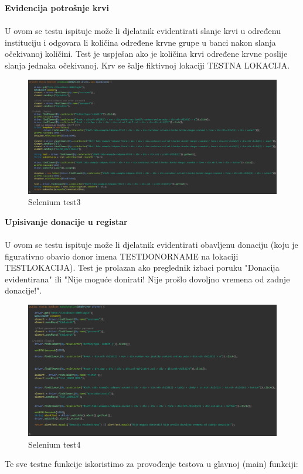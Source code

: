 \textbf{Evidencija potrošnje krvi}	
\\\\
U ovom se testu ispituje može li djelatnik evidentirati slanje krvi u određenu instituciju i odgovara li količina određene krvne grupe u banci nakon slanja očekivanoj količini. Test je uspješan ako je količina krvi određene krvne poslije slanja jednaka očekivanoj. Krv se šalje fiktivnoj lokaciji TESTNA LOKACIJA.
\begin{figure}[H]
	\centering
	\includegraphics[width=\textwidth, scale=0.5]{slike/selenium3}
	\caption{Selenium test3}
\end{figure}
\eject
\textbf{Upisivanje donacije u registar}	
\\\\
U ovom se testu ispituje može li djelatnik evidentirati obavljenu donaciju (koju je figurativno obavio donor imena TESTDONORNAME na lokaciji TESTLOKACIJA).
Test je prolazan ako preglednik izbaci poruku "Donacija evidentirana" ili "Nije moguće donirati! Nije prošlo dovoljno vremena od zadnje donacije!".
\begin{figure}[H]
	\centering
	\includegraphics[width=\textwidth, scale=0.5]{slike/selenium4}
	\caption{Selenium test4}
\end{figure}
\eject
Te sve testne funkcije iskoristimo za provođenje testova u glavnoj (main) funkciji:
